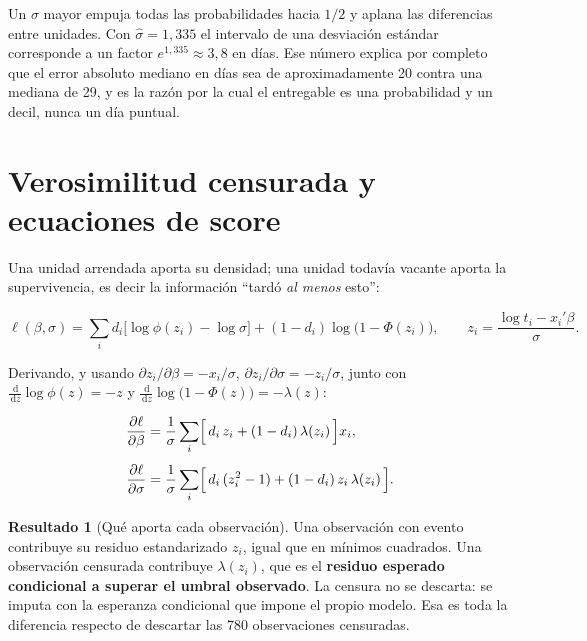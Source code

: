\documentclass[11pt,a4paper]{article}
\theoremstyle{definition}
\newtheorem{resultado}{Resultado}
\newcommand{\dd}{\,\mathrm{d}}
\begin{document}
Un $\sigma$ mayor empuja todas las probabilidades hacia $1/2$ y aplana las
diferencias entre unidades. Con $\hat{\sigma}=1{,}335$ el intervalo de una
desviación estándar corresponde a un factor $e^{1{,}335}\approx 3{,}8$ en días.
Ese número explica por completo que el error absoluto mediano en días sea de
aproximadamente 20 contra una mediana de 29, y es la razón por la cual el
entregable es una probabilidad y un decil, nunca un día puntual.

\section{Verosimilitud censurada y ecuaciones de score}

Una unidad arrendada aporta su densidad; una unidad todavía vacante aporta la
supervivencia, es decir la información ``tardó \emph{al menos} esto'':

\begin{equation}
\ell(\beta,\sigma)=\sum_i
d_i\bigl[\log\phi(z_i)-\log\sigma\bigr]
+(1-d_i)\log\bigl(1-\Phi(z_i)\bigr),
\qquad z_i=\frac{\log t_i-x_i'\beta}{\sigma}.
\label{eq:loglik}
\end{equation}

Derivando, y usando $\partial z_i/\partial\beta = -x_i/\sigma$,
$\partial z_i/\partial\sigma = -z_i/\sigma$, junto con
$\frac{\dd}{\dd z}\log\phi(z)=-z$ y
$\frac{\dd}{\dd z}\log\bigl(1-\Phi(z)\bigr)=-\lambda(z)$:

\begin{align}
\frac{\partial \ell}{\partial \beta}
&=\frac{1}{\sigma}\sum_i
\Bigl[\,d_i\,z_i+(1-d_i)\,\lambda(z_i)\,\Bigr]x_i,
\label{eq:scorebeta}\\[4pt]
\frac{\partial \ell}{\partial \sigma}
&=\frac{1}{\sigma}\sum_i
\Bigl[\,d_i\,(z_i^{2}-1)+(1-d_i)\,z_i\,\lambda(z_i)\,\Bigr].
\label{eq:scoresigma}
\end{align}

\begin{resultado}[Qué aporta cada observación]
Una observación con evento contribuye su residuo estandarizado $z_i$, igual que
en mínimos cuadrados. Una observación censurada contribuye $\lambda(z_i)$, que es
el \textbf{residuo esperado condicional a superar el umbral observado}. La
censura no se descarta: se imputa con la esperanza condicional que impone el
propio modelo. Esa es toda la diferencia respecto de descartar las 780
observaciones censuradas.
\end{resultado}
\end{document}
